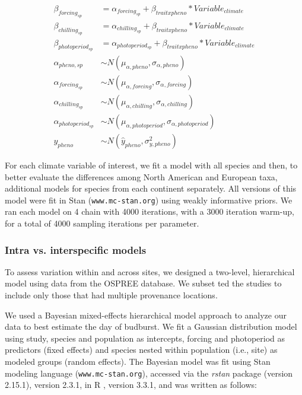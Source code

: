 \documentclass[12pt]{article}
\begin{document}
{\begin{align*}
\beta_{forcing_{sp}} & = \alpha_{forcing_{sp}} + \beta_{trait x pheno}*Variable_{climate} \\ %
\beta_{chilling_{sp}} & = \alpha_{chilling_{sp}} + \beta_{trait x pheno}*Variable_{climate} \\
\beta_{photoperiod_{sp}} & = \alpha_{photoperiod_{sp}} + \beta_{trait x pheno}*Variable_{climate} \\
\alpha_{pheno, sp} & \sim N(\mu_{\alpha, pheno}, \sigma_{\alpha, pheno}) \\
\alpha_{forcing_{sp}} & \sim N(\mu_{\alpha, forcing}, \sigma_{\alpha, forcing})\\
\alpha_{chilling_{sp}} & \sim N(\mu_{\alpha, chilling}, \sigma_{\alpha, chilling})\\
\alpha_{photoperiod_{sp}} & \sim N(\mu_{\alpha, photoperiod}, \sigma_{\alpha, photoperiod})\\
y_{pheno} & \sim N(\hat{y}_{pheno},\sigma^2_{y, pheno}) 

\end{align*}

For each climate variable of interest, we fit a model with all species and then, to better evaluate the differences among North American and European taxa, additional models for species from each continent separately. All versions of this model were fit in Stan \citep{Carpenter2017}(\texttt{www.mc-stan.org}) using weakly informative priors. We ran each model on 4 chain with 4000 iterations, with a 3000 iteration warm-up, for a total of 4000 sampling iterations per parameter. 

\subsubsection*{Intra vs. interspecific models}
To assess variation within and across sites, we designed a two-level, hierarchical model using data from the OSPREE database. We subset ted the studies to include only those that had multiple provenance locations. 

We used a Bayesian mixed-effects hierarchical model approach to analyze our data to best estimate the day of budburst. We fit a Gaussian distribution model using study, species and population as intercepts, forcing and photoperiod as predictors (fixed effects) and species nested within population (i.e., site) as modeled groups (random effects). The Bayesian model was fit using Stan modeling language \citep{Carpenter2017}(\texttt{www.mc-stan.org}), accessed via the \textit{rstan} package (version 2.15.1), version 2.3.1, in R \citep{R}, version 3.3.1, and was written as follows: 

}
\end{document}
